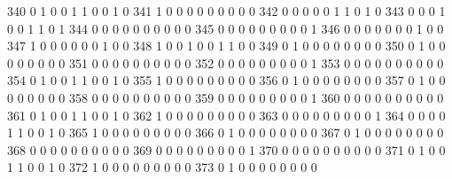 \documentclass[compress,8pt]{beamer}
\begin{document}
\begin{frame}
\begin{Schunk}
  340      0       1   0              0        1    1       0       0   1   0
  341      1       0   0              0        0    0       0       0   0   0
  342      0       0   0              0        0    1       1       0   1   0
  343      0       0   0              1        0    0       1       1   0   1
  344      0       0   0              0        0    0       0       0   0   0
  345      0       0   0              0        0    0       0       0   0   1
  346      0       0   0              0        0    0       0       1   0   0
  347      1       0   0              0        0    0       0       1   0   0
  348      1       0   0              1        0    0       1       1   0   0
  349      0       1   0              0        0    0       0       0   0   0
  350      0       1   0              0        0    0       0       0   0   0
  351      0       0   0              0        0    0       0       0   0   0
  352      0       0   0              0        0    0       0       0   0   1
  353      0       0   0              0        0    0       0       0   0   0
  354      0       1   0              0        1    1       0       0   1   0
  355      1       0   0              0        0    0       0       0   0   0
  356      0       1   0              0        0    0       0       0   0   0
  357      0       1   0              0        0    0       0       0   0   0
  358      0       0   0              0        0    0       0       0   0   0
  359      0       0   0              0        0    0       0       0   0   1
  360      0       0   0              0        0    0       0       0   0   0
  361      0       1   0              0        1    1       0       0   1   0
  362      1       0   0              0        0    0       0       0   0   0
  363      0       0   0              0        0    0       0       0   0   1
  364      0       0   0              0        1    1       0       0   1   0
  365      1       0   0              0        0    0       0       0   0   0
  366      0       1   0              0        0    0       0       0   0   0
  367      0       1   0              0        0    0       0       0   0   0
  368      0       0   0              0        0    0       0       0   0   0
  369      0       0   0              0        0    0       0       0   0   1
  370      0       0   0              0        0    0       0       0   0   0
  371      0       1   0              0        1    1       0       0   1   0
  372      1       0   0              0        0    0       0       0   0   0
  373      0       1   0              0        0    0       0       0   0   0

\end{Schunk}
\end{frame}
\end{document}
